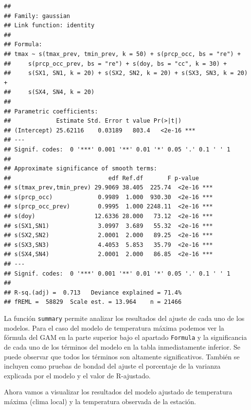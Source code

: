 \documentclass[
]{article}
\begin{document}
\begin{verbatim}
## 
## Family: gaussian 
## Link function: identity 
## 
## Formula:
## tmax ~ s(tmax_prev, tmin_prev, k = 50) + s(prcp_occ, bs = "re") + 
##     s(prcp_occ_prev, bs = "re") + s(doy, bs = "cc", k = 30) + 
##     s(SX1, SN1, k = 20) + s(SX2, SN2, k = 20) + s(SX3, SN3, k = 20) + 
##     s(SX4, SN4, k = 20)
## 
## Parametric coefficients:
##             Estimate Std. Error t value Pr(>|t|)    
## (Intercept) 25.62116    0.03189   803.4   <2e-16 ***
## ---
## Signif. codes:  0 '***' 0.001 '**' 0.01 '*' 0.05 '.' 0.1 ' ' 1
## 
## Approximate significance of smooth terms:
##                            edf Ref.df       F p-value    
## s(tmax_prev,tmin_prev) 29.9069 38.405  225.74  <2e-16 ***
## s(prcp_occ)             0.9989  1.000  930.30  <2e-16 ***
## s(prcp_occ_prev)        0.9995  1.000 2248.11  <2e-16 ***
## s(doy)                 12.6336 28.000   73.12  <2e-16 ***
## s(SX1,SN1)              3.0997  3.689   55.32  <2e-16 ***
## s(SX2,SN2)              2.0001  2.000   89.25  <2e-16 ***
## s(SX3,SN3)              4.4053  5.853   35.79  <2e-16 ***
## s(SX4,SN4)              2.0001  2.000   86.85  <2e-16 ***
## ---
## Signif. codes:  0 '***' 0.001 '**' 0.01 '*' 0.05 '.' 0.1 ' ' 1
## 
## R-sq.(adj) =  0.713   Deviance explained = 71.4%
## fREML =  58829  Scale est. = 13.964    n = 21466
\end{verbatim}

La función \texttt{summary} permite analizar los resultados del ajuste de cada uno de los modelos. Para el caso del modelo de temperatura máxima podemos ver la fórmula del GAM en la parte superior bajo el apartado \texttt{Formula} y la significancia de cada uno de los términos del modelo en la tabla inmediatamente inferior. Se puede observar que todos los términos son altamente significativos. También se incluyen como pruebas de bondad del ajuste el porcentaje de la varianza explicada por el modelo y el valor de R-ajustado.

Ahora vamos a visualizar los resultados del modelo ajustado de temperatura máxima (clima local) y la temperatura observada de la estación.
\end{document}
